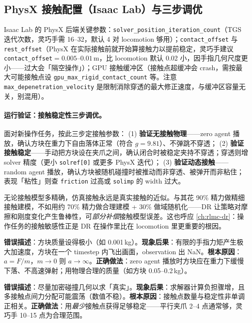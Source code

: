 \subsection{PhysX 接触配置（Isaac Lab）与三步调优}
\label{sec:rlmc-manip-physxcontact}

Isaac Lab 的 PhysX 后端关键参数：\verb|solver_position_iteration_count|（TGS 迭代次数，灵巧手需 16--32，默认 4 对 locomotion 够用）；\verb|contact_offset| 与 \verb|rest_offset|（PhysX 在实际接触前就开始算接触力以提前稳定，灵巧手建议 \verb|contact_offset|$=0.005$--$0.01$\,m，比 locomotion 默认 0.02 小，因手指几何尺度更小——过大会「隔空操作」）；GPU 接触缓冲区（接触点超缓冲会 crash，需按最大可能接触点设 \verb|gpu_max_rigid_contact_count| 等。注意 \verb|max_depenetration_velocity| 是限制消除穿透的最大修正速度，与缓冲区容量无关，别混用）。

\paragraph{运行验证：接触稳定性三步调优。}面对新操作任务，按此三步定接触参数：
(1) \textbf{验证无接触物理}——zero agent 播放，确认方块在重力下自由落体正常（符合 $g=9.81$）、不弹跳不穿透；
(2) \textbf{验证接触稳定}——手动把方块设在夹爪之间，确认闭合时被稳定夹持不穿透；穿透则增 solver 精度（更小 \verb|solref[0]| 或更多 PhysX 迭代）；
(3) \textbf{验证动态接触}——random agent 播放，确认方块被随机碰撞时被推动而非穿透、被弹开而非粘住；表现「粘性」则查 \verb|friction| 过高或 \verb|solimp| 的 width 过大。

\begin{insight}\label{ins:rlmc-manip-dr}
无论接触模型多精确，仿真接触永远是真实接触的近似。与其花 90\% 精力做精细接触建模，不如用约 70\% 精力做合理建模 + 30\% 做域随机化——DR 让策略对摩擦和刚度变化产生鲁棒性，可\emph{部分补偿}接触模型误差。这也呼应 \cref{ch:rlmc-dr}：操作任务的接触敏感性正是 DR 在操作里比在 locomotion 里更重要的根因。
\end{insight}

\begin{pitfall}[物体质量太小导致被「弹飞」]
\textbf{错误描述}：方块质量设得极小（如 0.001\,kg）。\textbf{现象后果}：有限的手指力矩产生极大加速度，方块在一个 timestep 内飞出画面，observation 出 NaN。\textbf{根本原因}：$a=F/m$，$m\to 0$ 则 $a\to\infty$。\textbf{正确做法}：zero agent 播放时方块应在重力下缓慢下落、不高速弹射；用物理合理的质量（如方块 0.05--0.2\,kg）。
\end{pitfall}

\begin{pitfall}[认为「更多接触点 = 更好的仿真」]
\textbf{错误描述}：尽量加密碰撞几何以求「真实」。\textbf{现象后果}：求解器计算负担骤增，且多接触点间力分配可能震荡（数值不稳）。\textbf{根本原因}：接触点数量与稳定性非单调正相关。\textbf{正确做法}：用\emph{最少}接触点获得足够稳定——平行夹爪 2--4 点通常够，灵巧手 10--15 点为合理范围。
\end{pitfall}

